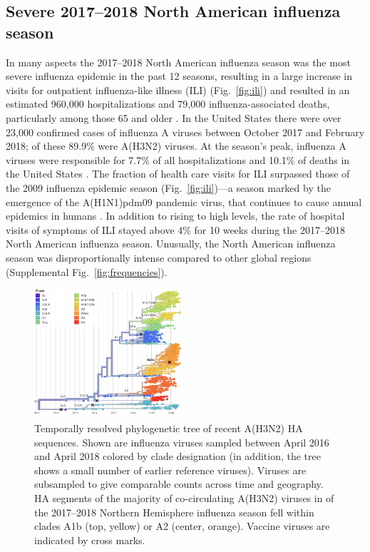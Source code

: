 \subsection*{Severe 2017--2018 North American influenza season}
In many aspects the 2017--2018 North American influenza season was the most severe influenza epidemic in the past 12 seasons, resulting in a large increase in visits for outpatient influenza-like illness (ILI) (Fig.~\ref{fig:ili}) and resulted in an estimated 960,000 hospitalizations and 79,000 influenza-associated deaths, particularly among those 65 and older \citep{Estimate3:online}.
In the United States there were over 23,000 confirmed cases of influenza A viruses between October 2017 and February 2018; of these 89.9\% were A(H3N2) viruses.
At the season's peak, influenza A viruses were responsible for 7.7\% of all hospitalizations and 10.1\% of deaths in the United States \citep{MMWR2018}.
The fraction of health care visits for ILI surpassed those of the 2009 influenza epidemic season (Fig.~\ref{fig:ili})---a season marked by the emergence of the A(H1N1)pdm09 pandemic virus, that continues to cause annual epidemics in humans \citep{garten_antigenic_2009}.
In addition to rising to high levels, the rate of hospital visits of symptoms of ILI stayed above 4\% for 10 weeks during the 2017--2018 North American influenza season.
Unusually, the North American influenza season was disproportionally intense compared to other global regions (Supplemental Fig.~\ref{fig:frequencies}).

\begin{figure}[t]
    \begin{center}
    \includegraphics[width=0.49\textwidth]{figures/2y_clades.png}
    \end{center}
    \caption{Temporally resolved phylogenetic tree of recent A(H3N2) HA sequences. Shown are influenza viruses sampled between April 2016 and April 2018 colored by clade designation (in addition, the tree shows a small number of earlier reference viruses). Viruses are subsampled to give comparable counts across time and geography. HA segments of the majority of co-circulating A(H3N2) viruses in of the 2017--2018 Northern Hemisphere influenza season fell within clades A1b (top, yellow) or A2 (center, orange). Vaccine viruses are indicated by cross marks. }
    \label{fig:2y_clades}
\end{figure}

